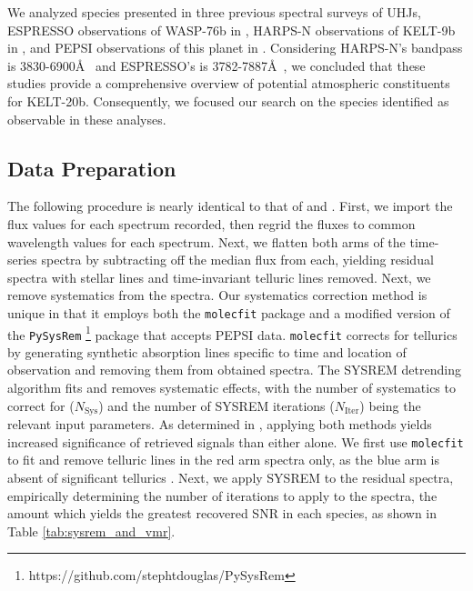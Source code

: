 \documentclass[twocolumn]{aastex631}
\newcommand{\code}[1]{\texttt{#1}}
\begin{document}
        We analyzed species presented in three previous spectral surveys of UHJs, ESPRESSO observations of WASP-76b in \cite{Kesseli2022}, HARPS-N observations of KELT-9b in \cite{Hoeijmakers2019}, and PEPSI observations of this planet in \cite{Petz2023}. Considering HARPS-N's bandpass is 3830-6900\AA\ \citep{Cosentino2012} and ESPRESSO's is 3782-7887\AA\ \citep{Pepe2021}, we concluded that these studies provide a comprehensive overview of potential atmospheric constituents for KELT-20b. Consequently, we focused our search on the species identified as observable in these analyses.
        
    \subsection{Data Preparation}\label{subsec:Data Preparation}
        The following procedure is nearly identical to that of \citep{Johnson2023} and \citep{Petz2023}. First, we import the flux values for each spectrum recorded, then regrid the fluxes to common wavelength values for each spectrum. Next, we flatten both arms of the time-series spectra by subtracting off the median flux from each, yielding residual spectra with stellar lines and time-invariant telluric lines removed. Next, we remove systematics from the spectra. Our systematics correction method is unique in that it employs both the \code{molecfit} package \citep{Smette2015, Kausch2015} and a modified version of the \code{PySysRem} \footnote{https://github.com/stephtdouglas/PySysRem} package that accepts PEPSI data. \code{molecfit} corrects for tellurics by generating synthetic absorption lines specific to time and location of observation and removing them from obtained spectra. The SYSREM detrending algorithm \citep{Tamuz2005} fits and removes systematic effects, with the number of systematics to correct for ($N_{\mathrm{Sys}}$) and the number of SYSREM iterations ($N_{\mathrm{Iter}}$) being the relevant input parameters. As determined in \cite{Johnson2023}, applying both methods yields increased significance of retrieved signals than either alone. We first use \code{molecfit} to fit and remove telluric lines in the red arm spectra only, as the blue arm is absent of significant tellurics \citep{Smette2015}. Next, we apply SYSREM to the residual spectra, empirically determining the number of iterations to apply to the spectra, the amount which yields the greatest recovered SNR in each species, as shown in Table \ref{tab:sysrem_and_vmr}.
\end{document}

